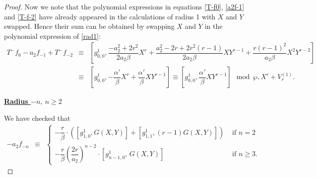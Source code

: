 \documentclass[11pt, reqno]{amsart}
\numberwithin{equation}{section}
\theoremstyle{definition}
\theoremstyle{remark}
\theoremstyle{definition}
\theoremstyle{remark}
\theoremstyle{remark}
\begin{document}
\begin{proof}
Now we note that the polynomial expressions in equations \eqref{T-f0}, \eqref{a2f-1} and \eqref{T-f-2} have already appeared in the calculations of radius 1 with $X$ and $Y$ swapped. Hence their sum can be obtained by swapping $X$ and $Y$ in the polynomial expression of \eqref{rad1}:
\begin{eqnarray*}
    T^-f_0-a_2f_{-1}+T^-f_{-2} & \equiv&  
        \left[g_{0,0}^{1}, \dfrac{-a_2^2+2r^2}{2a_2\beta}X^r + \dfrac{a_{2}^2-2r+2r^2(r-1)}{2a_2\beta}XY^{r-1}+\dfrac{r(r-1)^2}{a_2\beta}X^2Y^{r-2}\right]\\
       &\equiv& \left[g_{0,0}^1, -\dfrac{\alpha'}{\beta}X^r + \dfrac{\alpha'}{\beta}XY^{r-1}\right] \equiv \left[g_{0,0}^{1},\dfrac{\alpha'}{\beta}XY^{r-1}\right]\mod \wp,X^{r}+V_{r}^{(1)}.
\end{eqnarray*}

\noindent\textbf{\underline{Radius $-n,\: n\geq 2$}}

We have checked  that 
\begin{eqnarray}\label{conga2}
-a_{2}f_{-n} %
&\equiv & \begin{cases}
-\dfrac{r}{\beta}\cdot \left( \left[g_{1,0}^{1}, G(X,Y)   \right] + \left[g_{1,1}^{1}, (r-1)G(X,Y) \right] \right)&\text{ if } n=2\\
-\dfrac{r}{\beta}\left(\dfrac{2r}{a_2}\right)^{n-2}\cdot\left[g_{n-1,0}^1,\,G(X,Y)\right] &\text{ if } n\geq3.


\end{cases}
\end{eqnarray}
\end{proof}
\end{document}
